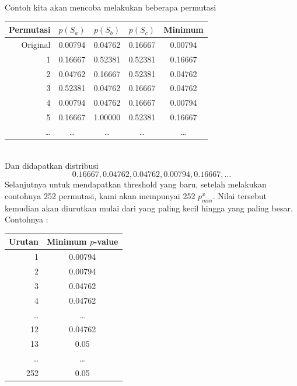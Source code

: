 \documentclass[a4paper,twoside]{article}
\begin{document}
\begin{enumerate}
	Contoh kita akan mencoba melakukan beberapa permutasi \\
	\begin{tabular}{r|c|c|c|c}
		\textbf{Permutasi} & \textbf{$p(S_a)$} & \textbf{$p(S_b)$} & \textbf{$p(S_c)$} & \textbf{Minimum} \\
		\midrule
		Original & 0.00794 & 0.04762 & 0.16667 & 0.00794 \\
		1 & 0.16667 & 0.52381 & 0.52381 & 0.16667 \\
		2 & 0.04762 & 0.16667 & 0.52381 & 0.04762 \\
		3 & 0.52381 & 0.04762 & 0.16667 & 0.04762 \\
		4 & 0.00794 & 0.04762 & 0.16667 & 0.00794 \\
		5 & 0.16667 & 1.00000 & 0.52381 & 0.16667 \\
		\ldots & \ldots & \ldots & \ldots & \ldots \\
	\end{tabular} \\
	Dan didapatkan distribusi \[ 0.16667, 0.04762, 0.04762, 0.00794, 0.16667,\ldots \]
	Selanjutnya untuk mendapatkan threshold yang baru, setelah melakukan contohnya 252 permutasi, kami akan mempunyai 252 $p_{min}^x$. 
	Nilai tersebut kemudian akan diurutkan mulai dari yang paling kecil hingga yang paling besar. Contohnya : \\
	\begin{tabular}{r|c}
		\textbf{Urutan} & \textbf{Minimum $p$-value} \\
		\midrule
		1 & 0.00794 \\
		2 & 0.00794 \\
		3 & 0.04762 \\
		4 & 0.04762 \\
		\ldots & \ldots \\
		12 & 0.04762 \\
		13 & 0.05 \\
		\ldots	& \ldots \\
		252 & 0.05 \\
	\end{tabular}


\end{enumerate}
\end{document}

